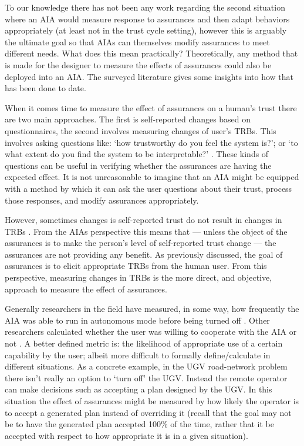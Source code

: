     To our knowledge there has not been any work regarding the second situation where an AIA would measure response to assurances and then adapt behaviors appropriately (at least not in the trust cycle setting), however this is arguably the ultimate goal so that AIAs can themselves modify assurances to meet different needs. What does this mean practically? Theoretically, any method that is made for the designer to measure the effects of assurances could also be deployed into an AIA. The surveyed literature gives some insights into how that has been done to date.
   
    When it comes time to measure the effect of assurances on a human's trust there are two main approaches. The first is self-reported changes based on questionnaires, the second involves measuring changes of user's TRBs. This involves asking questions like: `how trustworthy do you feel the system is?'; or `to what extent do you find the system to be interpretable?' \cite{Mcknight2011-gv,Muir1996-gt,Wickens1999-la,Salem2015-md,Kaniarasu2013-ho}. These kinds of questions can be useful in verifying whether the assurances are having the expected effect. It is not unreasonable to imagine that an AIA might be equipped with a method by which it can ask the user questions about their trust, process those responses, and modify assurances appropriately.
    
    However, sometimes changes is self-reported trust do not result in changes in TRBs \cite{Dzindolet2003-ts}. From the AIAs perspective this means that --- unless the object of the assurances is to make the person's level of self-reported trust change --- the assurances are not providing any benefit. As previously discussed, the goal of assurances is to elicit appropriate TRBs from the human user. From this perspective, measuring changes in TRBs is the more direct, and objective, approach to measure the effect of assurances.

    Generally researchers in the field have measured, in some way, how frequently the AIA was able to run in autonomous mode before being turned off \cite{Freedy2007-sg,Desai2012-rc}. Other researchers calculated whether the user was willing to cooperate with the AIA or not \cite{Salem2015-md,Wu2016-ei,Bainbridge2011-pl}. A better defined metric is: the likelihood of appropriate use of a certain capability by the user; albeit more difficult to formally define/calculate in different situations. As a concrete example, in the UGV road-network problem there isn't really an option to `turn off' the UGV. Instead the remote operator can make decisions such as accepting a plan designed by the UGV. In this situation the effect of assurances might be measured by how likely the operator is to accept a generated plan instead of overriding it (recall that the goal may not be to have the generated plan accepted 100\% of the time, rather that it be accepted with respect to how appropriate it is in a given situation).

